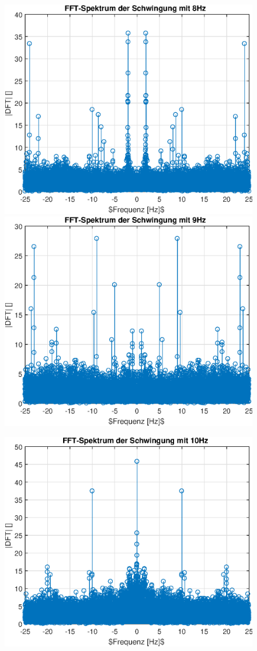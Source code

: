 \documentclass{article}
\begin{document}
\begin{figure}[h!]
\includegraphics[width=0.5\linewidth]{img/dft_sinefreq_8}
\includegraphics[width=0.5\linewidth]{img/dft_sinefreq_9}
\end{figure}
\begin{figure}[h!]
\centering
\includegraphics[width=0.5\linewidth]{img/dft_sinefreq_10}
\end{figure}

\newpage
\end{document}
